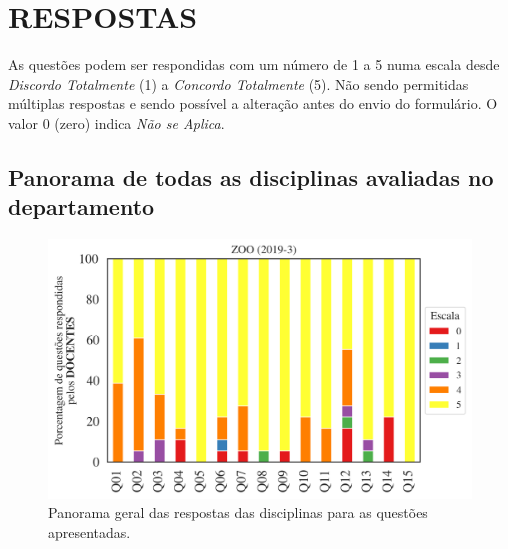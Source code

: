 \documentclass[a4paper,10pt]{article}
\begin{document}
\section{RESPOSTAS}
As questões podem ser respondidas com um número de 1 a 5 numa escala desde {\it Discordo Totalmente} (1) a {\it Concordo Totalmente} (5). Não sendo permitidas múltiplas respostas e sendo possível a alteração antes do envio do formulário. O valor 0 (zero) indica {\it Não se Aplica}.

\subsection{Panorama de todas as disciplinas avaliadas no departamento}
\begin{figure}[h]
\centering
\includegraphics[width=0.85\linewidth]{analise_geral_departamento_ZOO_docentes.png}
\caption{\label{fig:analise_geral_departamento}            Panorama geral das respostas das disciplinas para as questões apresentadas.}
\end{figure}
\end{document}
